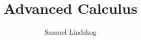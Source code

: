\documentclass[nobib,notoc]{tufte-handout}
\begin{document}
\theoremstyle{definition}\newtheorem{defi}{Definition}[section]
\theoremstyle{definition}\newtheorem{axiom}{Axiom}[section]
\theoremstyle{definition}\newtheorem{thm}{Theorem}[section]
\theoremstyle{definition}\newtheorem{cor}{Corollary}[section]
\theoremstyle{definition}\newtheorem{lem}{Lemma}[section]
\theoremstyle{remark}\newtheorem*{notat}{Notation}
\theoremstyle{remark}\newtheorem*{rema}{Remark}
\theoremstyle{definition}\newtheorem{problem}{Problem}
\newenvironment{prob}[1]{\protect\setcounter{problem}{#1}\addtocounter{problem}{-1}\begin{problem}}{\end{problem}}

\title{Advanced Calculus}
\author{Samuel Lindskog}
\maketitle

\setcounter{section}{1}
\end{document}
